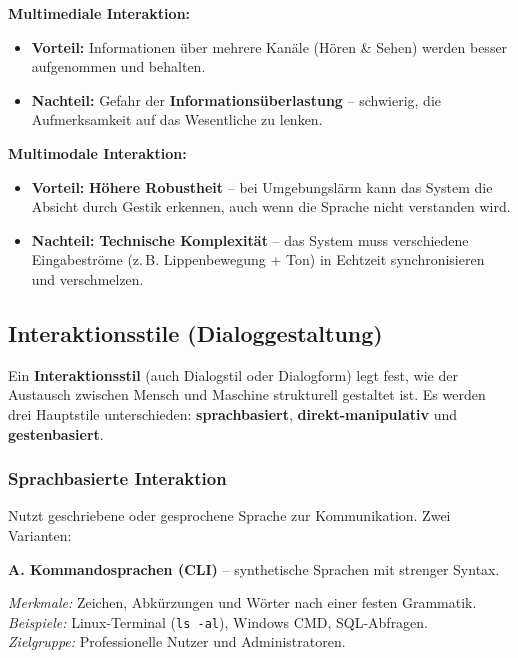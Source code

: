 \documentclass[12pt, a4paper]{article}
\begin{document}
\textbf{Multimediale Interaktion:}
\begin{itemize}
  \item \textbf{Vorteil:} Informationen über mehrere Kanäle (Hören \& Sehen) werden
        besser aufgenommen und behalten.
  \item \textbf{Nachteil:} Gefahr der \textbf{Informationsüberlastung} -- schwierig,
        die Aufmerksamkeit auf das Wesentliche zu lenken.
\end{itemize}

\textbf{Multimodale Interaktion:}
\begin{itemize}
  \item \textbf{Vorteil:} \textbf{Höhere Robustheit} -- bei Umgebungslärm kann das
        System die Absicht durch Gestik erkennen, auch wenn die Sprache nicht
        verstanden wird.
  \item \textbf{Nachteil:} \textbf{Technische Komplexität} -- das System muss
        verschiedene Eingabeströme (z.\,B. Lippenbewegung + Ton) in Echtzeit
        synchronisieren und verschmelzen.
\end{itemize}

\subsection{Interaktionsstile (Dialoggestaltung)}

Ein \textbf{Interaktionsstil} (auch Dialogstil oder Dialogform) legt fest, wie der
Austausch zwischen Mensch und Maschine strukturell gestaltet ist. Es werden drei
Hauptstile unterschieden: \textbf{sprachbasiert}, \textbf{direkt-manipulativ} und
\textbf{gestenbasiert}.

\subsubsection{Sprachbasierte Interaktion}

Nutzt geschriebene oder gesprochene Sprache zur Kommunikation. Zwei Varianten:

\textbf{A. Kommandosprachen (CLI)} -- synthetische Sprachen mit strenger Syntax.

\textit{Merkmale:} Zeichen, Abkürzungen und Wörter nach einer festen Grammatik.\\
\textit{Beispiele:} Linux-Terminal (\texttt{ls -al}), Windows CMD, SQL-Abfragen.\\
\textit{Zielgruppe:} Professionelle Nutzer und Administratoren.
\end{document}
